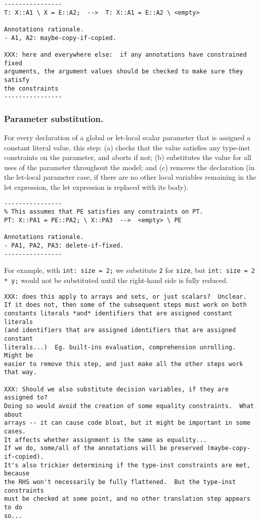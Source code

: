 \documentclass[10pt]{article}
\begin{document}
\begin{verbatim}
----------------
T: X::A1 \ X = E::A2;  -->  T: X::A1 = E::A2 \ <empty>

Annotations rationale.
- A1, A2: maybe-copy-if-copied.

XXX: here and everywhere else:  if any annotations have constrained fixed
arguments, the argument values should be checked to make sure they satisfy
the constraints
----------------
\end{verbatim}

\subsubsection{Parameter substitution.}
For every declaration of a global or let-local scalar parameter that is
assigned a constant literal value, this step:
(a) checks that the value satisfies any type-inst constraints on the
parameter, and aborts if not;
(b) substitutes the value for all uses of the parameter throughout the
model;
and (c) removes the declaration (in the let-local parameter case, if there
are no other local variables remaining in the let expression, the let
expression is replaced with its body).

\begin{verbatim}
----------------
% This assumes that PE satisfies any constraints on PT.
PT: X::PA1 = PE::PA2; \ X::PA3  -->  <empty> \ PE

Annotations rationale.
- PA1, PA2, PA3: delete-if-fixed.
----------------
\end{verbatim}

For example, with \verb+int: size = 2;+ we substitute \texttt{2} for
\texttt{size}, but \verb+int: size = 2 * y;+ would not be substituted
until the right-hand side is fully reduced.  

\begin{verbatim}
XXX: does this apply to arrays and sets, or just scalars?  Unclear.
If it does not, then some of the subsequent steps must work on both
constants literals *and* identifiers that are assigned constant literals
(and identifiers that are assigned identifiers that are assigned constant
literals...)  Eg. built-ins evaluation, comprehension unrolling.  Might be
easier to remove this step, and just make all the other steps work that way.

XXX: Should we also substitute decision variables, if they are assigned to?
Doing so would avoid the creation of some equality constraints.  What about
arrays -- it can cause code bloat, but it might be important in some cases.
It affects whether assignment is the same as equality...
If we do, some/all of the annotations will be preserved (maybe-copy-if-copied).
It's also trickier determining if the type-inst constraints are met, because
the RHS won't necessarily be fully flattened.  But the type-inst constraints
must be checked at some point, and no other translation step appears to do
so...
\end{verbatim}
\end{document}
